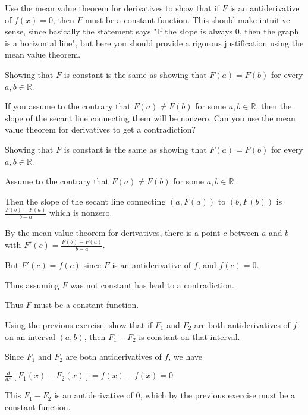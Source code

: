 \documentclass{ximera}
\begin{document}
	\begin{question}
		Use the mean value theorem for derivatives to show that if $F$ is an antiderivative of $f(x) = 0$, then $F$ must be a constant function.  This should make intuitive sense, since basically the statement says "If the slope is always 0, then the graph is a horizontal line", but here you should provide a rigorous justification using the mean value theorem.
		
		\begin{hint}
			Showing that $F$ is constant is the same as showing that $F(a) = F(b)$ for every $a,b \in \mathbb{R}$.
		\end{hint}
		\begin{hint}
			If you assume to the contrary that $F(a) \neq F(b)$ for some $a,b \in \mathbb{R}$, then the slope of the secant line connecting them will be nonzero.  Can you use the mean value theorem for derivatives to get a contradiction?
 		\end{hint}
		
		\begin{free-response}
			Showing that $F$ is constant is the same as showing that $F(a) = F(b)$ for every $a,b \in \mathbb{R}$.
			
			Assume to the contrary that $F(a) \neq F(b)$ for some $a,b \in \mathbb{R}$.
			
			Then the slope of the secant line connecting $(a,F(a))$ to $(b,F(b))$ is $\frac{F(b)-F(a)}{b-a}$ which is nonzero.
			
			By the mean value theorem for derivatives, there is a point $c$ between $a$ and $b$ with $F'(c) = \frac{F(b) - F(a)}{b-a}$.
			
			But $F'(c) = f(c)$ since $F$ is an antiderivative of $f$, and $f(c) = 0$.
			
			Thus assuming $F$ was not constant has lead to a contradiction.
			
			Thus $F$ must be a constant function. 
		\end{free-response}
	\end{question}
	
	\begin{question}
		Using the previous exercise, show that if $F_1$ and $F_2$ are both antiderivatives of $f$ on an interval $(a,b)$, then $F_1 - F_2$ is constant on that interval. 
		\begin{free-response}
			Since $F_1$ and $F_2$ are both antiderivatives of $f$, we have
			
			$\frac{d}{dx}  \left[ F_1(x) - F_2(x)\right]  =f(x) - f(x) = 0$
			
			This $F_1 - F_2$ is an antiderivative of $0$, which by the previous exercise must be a constant function.
		\end{free-response}
	\end{question}
	
\end{document}
